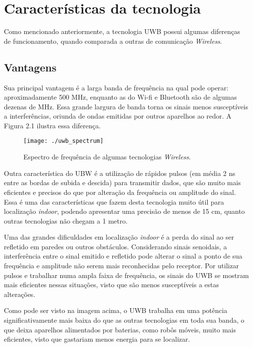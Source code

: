 \section{Características da tecnologia}
\label{sec:ass1}
Como mencionado anteriormente, a tecnologia UWB possui algumas diferenças de funcionamento,
quando comparada a outras de comunicação \textit{Wireless}. 

\subsection{Vantagens}
Sua principal vantagem é a larga banda de frequência na qual pode operar: aproximadamente 500 MHz, 
enquanto as do Wi-fi e Bluetooth são de algumas dezenas de MHz. Essa grande largura de banda torna 
os sinais menos susceptíveis a interferências, oriunda de ondas emitidas por outros aparelhos ao redor.
A Figura 2.1 ilustra essa diferença.

\begin{figure} [h!]												 
	\centering													 
	\texttt{[image: ./uwb\_spectrum]}				 
	\caption{Espectro de frequência de algumas tecnologias \textit{Wireless}.}		
	\label{img:ihuma}												 
\end{figure}

Outra característica do UBW é a utilização de rápidos pulsos (em média 2 ns entre as bordas de subida e descida) para transmitir dados, 
que são muito mais eficientes e precisos do que por alteração da frequência ou amplitude do sinal. Essa é uma das características
que fazem desta tecnologia muito útil para localização \textit{indoor}, podendo apresentar uma precisão de menos de 15 cm,
quanto outras tecnologias não chegam a 1 metro.

Uma das grandes dificuldades em localização \textit{indoor} é a perda do sinal ao ser refletido em paredes ou outros obstáculos. Considerando sinais
senoidais, a interferência entre o sinal emitido e refletido pode alterar o sinal a ponto de sua frequência e amplitude não serem
mais reconhecidas pelo receptor. Por utilizar pulsos e trabalhar numa ampla faixa de frequência, os sinais do UWB se mostram mais 
eficientes nessas situações, visto que são menos susceptíveis a estas alterações.

Como pode ser visto na imagem acima, o UWB trabalha em uma potência significativamente mais baixa do que as outras tecnologias em 
toda sua banda, o que deixa aparelhos alimentados por baterias, como robôs móveis, muito mais eficientes, visto que gastariam menos energia
para se localizar.

